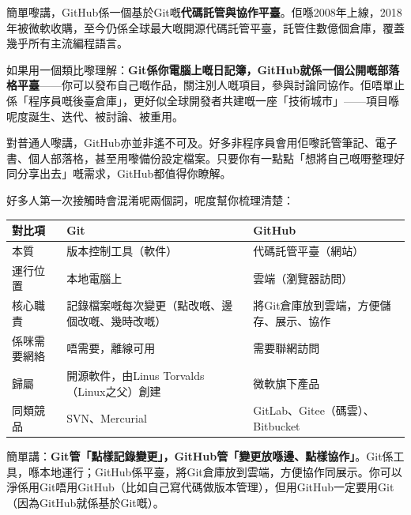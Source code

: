 


簡單嚟講，GitHub係一個基於Git嘅\textbf{代碼託管與協作平臺}。佢喺2008年上線，2018年被微軟收購，至今仍係全球最大嘅開源代碼託管平臺，託管住數億個倉庫，覆蓋幾乎所有主流編程語言。

如果用一個類比嚟理解：\textbf{Git係你電腦上嘅日記簿，GitHub就係一個公開嘅部落格平臺}——你可以發布自己嘅作品，關注別人嘅項目，參與討論同協作。佢唔單止係「程序員嘅後臺倉庫」，更好似全球開發者共建嘅一座「技術城市」——項目喺呢度誕生、迭代、被討論、被重用。

對普通人嚟講，GitHub亦並非遙不可及。好多非程序員會用佢嚟託管筆記、電子書、個人部落格，甚至用嚟備份設定檔案。只要你有一點點「想將自己嘅嘢整理好同分享出去」嘅需求，GitHub都值得你瞭解。


好多人第一次接觸時會混淆呢兩個詞，呢度幫你梳理清楚：

\begin{center}
\begin{tabularx}{\linewidth}{|X|X|X|}
\hline
\textbf{對比項} & \textbf{Git} & \textbf{GitHub} \tabularnewline
\hline
本質 & 版本控制工具（軟件） & 代碼託管平臺（網站） \tabularnewline
運行位置 & 本地電腦上 & 雲端（瀏覽器訪問） \tabularnewline
核心職責 & 記錄檔案嘅每次變更（點改嘅、邊個改嘅、幾時改嘅） & 將Git倉庫放到雲端，方便儲存、展示、協作 \tabularnewline
係咪需要網絡 & 唔需要，離線可用 & 需要聯網訪問 \tabularnewline
歸屬 & 開源軟件，由Linus Torvalds（Linux之父）創建 & 微軟旗下產品 \tabularnewline
同類競品 & SVN、Mercurial & GitLab、Gitee（碼雲）、Bitbucket \tabularnewline
\hline
\end{tabularx}
\end{center}

簡單講：\textbf{Git管「點樣記錄變更」，GitHub管「變更放喺邊、點樣協作」}。Git係工具，喺本地運行；GitHub係平臺，將Git倉庫放到雲端，方便協作同展示。你可以淨係用Git唔用GitHub（比如自己寫代碼做版本管理），但用GitHub一定要用Git（因為GitHub就係基於Git嘅）。


